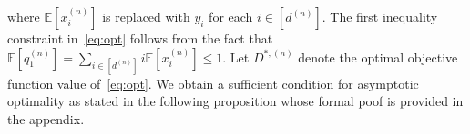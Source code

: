 \documentclass[a4paper]{article}
\theoremstyle{plain}
\theoremstyle{definition}
\theoremstyle{case}
\theoremstyle{remark}
\newcommand{\E}{\mathbb{E}}
\begin{document}
%
where $\E[x_i^{(n)}]$ is replaced with $y_i$ for each $i \in [d^{(n)}]$. The first inequality constraint in~\eqref{eq:opt} follows from the fact that $\E[q_1^{(n)}]= \sum_{i\in [d^{(n)}]}i \E[x_i^{(n)}] \leq 1$.
Let $D^{*,(n)}$ denote the optimal objective function value of~\eqref{eq:opt}. We obtain a sufficient condition for asymptotic optimality as stated in the following proposition whose formal poof is provided in the appendix.
\end{document}
